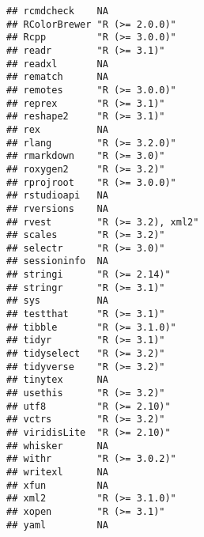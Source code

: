 \documentclass[]{book}
\begin{document}
\begin{verbatim}
## rcmdcheck    NA                                               
## RColorBrewer "R (>= 2.0.0)"                                   
## Rcpp         "R (>= 3.0.0)"                                   
## readr        "R (>= 3.1)"                                     
## readxl       NA                                               
## rematch      NA                                               
## remotes      "R (>= 3.0.0)"                                   
## reprex       "R (>= 3.1)"                                     
## reshape2     "R (>= 3.1)"                                     
## rex          NA                                               
## rlang        "R (>= 3.2.0)"                                   
## rmarkdown    "R (>= 3.0)"                                     
## roxygen2     "R (>= 3.2)"                                     
## rprojroot    "R (>= 3.0.0)"                                   
## rstudioapi   NA                                               
## rversions    NA                                               
## rvest        "R (>= 3.2), xml2"                               
## scales       "R (>= 3.2)"                                     
## selectr      "R (>= 3.0)"                                     
## sessioninfo  NA                                               
## stringi      "R (>= 2.14)"                                    
## stringr      "R (>= 3.1)"                                     
## sys          NA                                               
## testthat     "R (>= 3.1)"                                     
## tibble       "R (>= 3.1.0)"                                   
## tidyr        "R (>= 3.1)"                                     
## tidyselect   "R (>= 3.2)"                                     
## tidyverse    "R (>= 3.2)"                                     
## tinytex      NA                                               
## usethis      "R (>= 3.2)"                                     
## utf8         "R (>= 2.10)"                                    
## vctrs        "R (>= 3.2)"                                     
## viridisLite  "R (>= 2.10)"                                    
## whisker      NA                                               
## withr        "R (>= 3.0.2)"                                   
## writexl      NA                                               
## xfun         NA                                               
## xml2         "R (>= 3.1.0)"                                   
## xopen        "R (>= 3.1)"                                     
## yaml         NA                                               

\end{verbatim}
\end{document}
